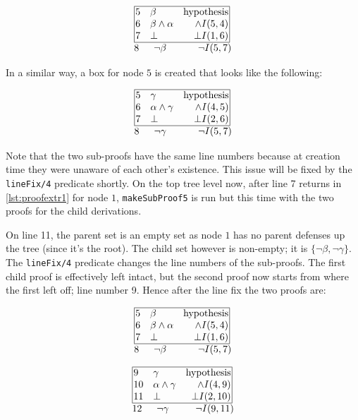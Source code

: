 \documentclass[11pt,twoside,a4paper]{report}
\begin{document}
\[\vbox{\offinterlineskip\halign{
&\tabskip=1.5em#\strut&$#$\hfil\tabskip=1em&\hfil$#$\tabskip=0em\cr
%
\multispan3\vbox{\halign{
\vrule#&&\hskip.1em\tabskip=1em#\strut&$#$\hfil\tabskip=1em&\hfil$#$\hskip0.1em\tabskip=0em&\vrule#\cr
\noalign{\hrule}
%
&5&\beta&\mbox{hypothesis}&\cr
&6&\beta\wedge\alpha&\wedge I(5,4)&\cr
&7&\bot&\bot I(1,6)&\cr
%
\noalign{\hrule}}}\,\cr
%
8&\neg\beta&\neg I(5,7)\cr
}}\]

In a similar way, a box for node $5$ is created that looks like the following:

\[\vbox{\offinterlineskip\halign{
&\tabskip=1.5em#\strut&$#$\hfil\tabskip=1em&\hfil$#$\tabskip=0em\cr
%
\multispan3\vbox{\halign{
\vrule#&&\hskip.1em\tabskip=1em#\strut&$#$\hfil\tabskip=1em&\hfil$#$\hskip0.1em\tabskip=0em&\vrule#\cr
\noalign{\hrule}
%
&5&\gamma&\mbox{hypothesis}&\cr
&6&\alpha\wedge\gamma&\wedge I(4,5)&\cr
&7&\bot&\bot I(2,6)&\cr
%
\noalign{\hrule}}}\,\cr
%
8&\neg\gamma&\neg I(5,7)\cr
}}\]

Note that the two sub-proofs have the same line numbers because at creation time they were unaware of each other's existence. This issue will be fixed by the \lstinline$lineFix/4$ predicate shortly. On the top tree level now, after line 7 returns in \autoref{lst:proofextr1} for node $1$, \lstinline$makeSubProof5$ is run but this time with the two proofs for the child derivations.

On line 11, the parent set is an empty set as node $1$ has no parent defenses up the tree (since it's the root). The child set however is non-empty; it is $\{\neg\beta, \neg\gamma\}$. The \lstinline$lineFix/4$ predicate changes the line numbers of the sub-proofs. The first child proof is effectively left intact, but the second proof now starts from where the first left off; line number 9. Hence after the line fix the two proofs are:

\begin{minipage}[c]{0.5\linewidth}
\[\vbox{\offinterlineskip\halign{
&\tabskip=1.5em#\strut&$#$\hfil\tabskip=1em&\hfil$#$\tabskip=0em\cr
%
\multispan3\vbox{\halign{
\vrule#&&\hskip.1em\tabskip=1em#\strut&$#$\hfil\tabskip=1em&\hfil$#$\hskip0.1em\tabskip=0em&\vrule#\cr
\noalign{\hrule}
%
&5&\beta&\mbox{hypothesis}&\cr
&6&\beta\wedge\alpha&\wedge I(5,4)&\cr
&7&\bot&\bot I(1,6)&\cr
%
\noalign{\hrule}}}\,\cr
%
8&\neg\beta&\neg I(5,7)\cr
}}\]
\end{minipage}%
\begin{minipage}[c]{0.5\linewidth}
\[\vbox{\offinterlineskip\halign{
&\tabskip=1.5em#\strut&$#$\hfil\tabskip=1em&\hfil$#$\tabskip=0em\cr
%
\multispan3\vbox{\halign{
\vrule#&&\hskip.1em\tabskip=1em#\strut&$#$\hfil\tabskip=1em&\hfil$#$\hskip0.1em\tabskip=0em&\vrule#\cr
\noalign{\hrule}
%
&9&\gamma&\mbox{hypothesis}&\cr
&10&\alpha\wedge\gamma&\wedge I(4,9)&\cr
&11&\bot&\bot I(2,10)&\cr
%
\noalign{\hrule}}}\,\cr
%
12&\neg\gamma&\neg I(9,11)\cr
}}\]
\end{minipage}
\end{document}
